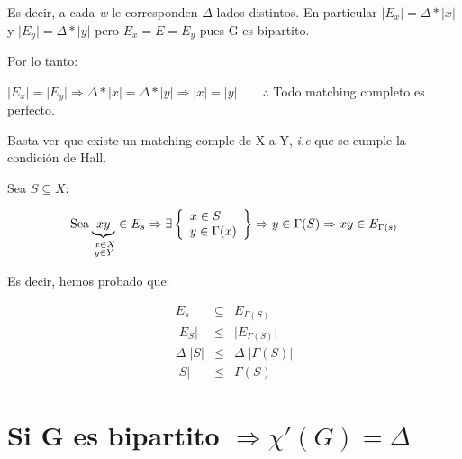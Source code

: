 \documentclass[12pt,a4paper]{report}
\begin{document}
		Es decir, a cada \textit{w} le corresponden $\Delta$ lados distintos. En particular $\lvert E_{x} \rvert = \Delta * \lvert x \rvert$ y $\lvert E_{y} \rvert = \Delta * \lvert y \rvert$ pero $E_{x} = E = E_{y}$ pues G es bipartito.
		
		\vspace{5mm}
		Por lo tanto:
		
		$ \lvert E_{x} \rvert = \lvert E_{y} \rvert \Rightarrow \Delta * \lvert x \rvert = \Delta * \lvert y \rvert \Rightarrow \lvert x \rvert = \lvert y \rvert \qquad \therefore$ Todo matching completo es perfecto.
		
	
		Basta ver que existe un matching comple de X a Y, \textit{i.e} que se cumple la condición de Hall.
		
		\vspace{5mm}
		Sea $S \subseteq X$:
		
		\begin{equation*}
			\text{Sea} 
			\underbrace{xy}_{\begin{subarray}{l} \; x \in X \\
	\; y \in Y \end{subarray}} \in E_{s} \Rightarrow
			{\Huge \exists}
  			\left\lbrace
  			\begin{array}{l}
    		 x \in S \\
     		 y \in \Gamma(x) \\
  			\end{array}
 			 \right\rbrace
 			 \Rightarrow y \in \Gamma(S) \Rightarrow xy \in E_{\Gamma(s)}
		\end{equation*}		
		
		\vspace{3mm}
		Es decir, hemos probado que:
		
		\begin{eqnarray}
			\nonumber E_{s} & \subseteq & E_{\Gamma(S)} \\
			\nonumber \lvert E_{S} \rvert &\leq & \lvert E_{\Gamma(S)} \rvert \\
			\nonumber \Delta \; \lvert S \rvert & \leq & \Delta \; \lvert \Gamma(S) \rvert \\
			\nonumber \lvert S \rvert & \leq & \Gamma(S)
		\end{eqnarray}
		
	\section{Si G es bipartito $\Rightarrow \chi '(G) = \Delta $}
	
\end{document}
